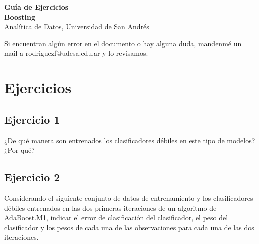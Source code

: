 \documentclass[12pt]{article}
\begin{document}
\begin{center}
  {\LARGE \textbf{Guía de Ejercicios\\Boosting}}\\[0.5em]
  {Analítica de Datos, Universidad de San Andrés}
\end{center}

Si encuentran algún error en el documento o hay alguna duda, mandenmé un mail a rodriguezf@udesa.edu.ar y lo revisamos.

\section{Ejercicios}

\subsection{Ejercicio 1}

¿De qué manera son entrenados los clasificadores débiles en este tipo de modelos? ¿Por qué?

\subsection{Ejercicio 2}

Considerando el siguiente conjunto de datos de entrenamiento y los clasificadores débiles entrenados en las dos primeras iteraciones de un algoritmo de AdaBoost.M1, indicar el error de clasificación del clasificador, el peso del clasificador y los pesos de cada una de las observaciones para cada una de las dos iteraciones.
\end{document}
